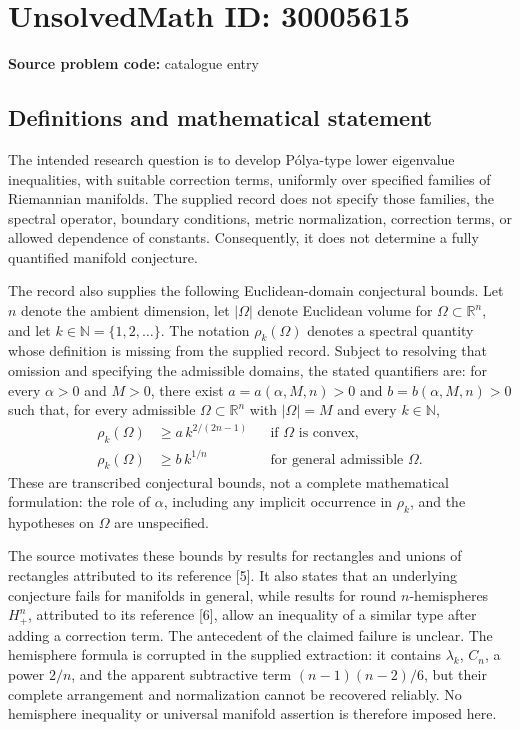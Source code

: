 \documentclass[11pt]{article}
\newcommand{\N}{\mathbb{N}}
\newcommand{\R}{\mathbb{R}}
\begin{document}
\section*{UnsolvedMath ID: 30005615}
\textbf{Source problem code:} catalogue entry
\subsection{Definitions and mathematical statement}
The intended research question is to develop P\'olya-type lower eigenvalue inequalities, with suitable correction terms, uniformly over specified families of Riemannian manifolds. The supplied record does not specify those families, the spectral operator, boundary conditions, metric normalization, correction terms, or allowed dependence of constants. Consequently, it does not determine a fully quantified manifold conjecture.

The record also supplies the following Euclidean-domain conjectural bounds. Let \(n\) denote the ambient dimension, let \(|\Omega|\) denote Euclidean volume for \(\Omega\subset\R^n\), and let \(k\in\N=\{1,2,\ldots\}\). The notation \(\rho_k(\Omega)\) denotes a spectral quantity whose definition is missing from the supplied record. Subject to resolving that omission and specifying the admissible domains, the stated quantifiers are: for every \(\alpha>0\) and \(M>0\), there exist \(a=a(\alpha,M,n)>0\) and \(b=b(\alpha,M,n)>0\) such that, for every admissible \(\Omega\subset\R^n\) with \(|\Omega|=M\) and every \(k\in\N\),
\[
\begin{aligned}
\rho_k(\Omega)&\geq a\,k^{2/(2n-1)} &&\text{if \(\Omega\) is convex},\\
\rho_k(\Omega)&\geq b\,k^{1/n} &&\text{for general admissible \(\Omega\)}.
\end{aligned}
\]
These are transcribed conjectural bounds, not a complete mathematical formulation: the role of \(\alpha\), including any implicit occurrence in \(\rho_k\), and the hypotheses on \(\Omega\) are unspecified.

The source motivates these bounds by results for rectangles and unions of rectangles attributed to its reference [5]. It also states that an underlying conjecture fails for manifolds in general, while results for round \(n\)-hemispheres \(H_+^n\), attributed to its reference [6], allow an inequality of a similar type after adding a correction term. The antecedent of the claimed failure is unclear. The hemisphere formula is corrupted in the supplied extraction: it contains \(\lambda_k\), \(C_n\), a power \(2/n\), and the apparent subtractive term \((n-1)(n-2)/6\), but their complete arrangement and normalization cannot be recovered reliably. No hemisphere inequality or universal manifold assertion is therefore imposed here.
\end{document}

